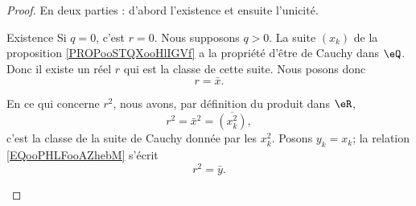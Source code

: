 \begin{proof}
    En deux parties : d'abord l'existence et ensuite l'unicité.
    \begin{subproof}
        \item[Existence]
            Si \( q=0\), c'est \( r=0\). Nous supposons \( q>0\). La suite \( (x_k)\) de la proposition \ref{PROPooSTQXooHlIGVf} a la propriété d'être de Cauchy dans \( \eQ\). Donc il existe un réel \( r\) qui est la classe de cette suite. Nous posons donc
            \begin{equation}
                r=\bar x.
            \end{equation}
            
            En ce qui concerne \( r^2\), nous avons, par définition du produit dans \( \eR\),    
            \begin{equation}        \label{EQooPHLFooAZhebM}
                r^2=\bar x^2=\overline{ (x_k^2) },
            \end{equation}
            c'est la classe de la suite de Cauchy donnée par les \( x_k^2\). Posons \( y_k=x_k\); la relation \eqref{EQooPHLFooAZhebM} s'écrit
            \begin{equation}
                r^2=\bar y.
            \end{equation}
            

\end{subproof}
\end{proof}
